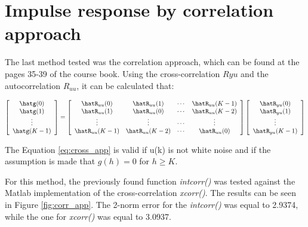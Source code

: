 \documentclass[a4paper,11pt]{article}
\newcommand{\Test}[1]{\expandafter\hat#1}
\begin{document}
\section{Impulse response by correlation approach}

The last method tested was the correlation approach, which can be found at the pages 35-39 of the course book. Using the cross-correlation $R{yu}$ and the autocorrelation $R_{uu}$, it can be calculated that:

\begin{equation}
\label{eq:cross_app}
  \left[ {\begin{array}{c}
   \Test{g(0)}\\
   \Test{g(1)}\\
   \vdots \\
   \Test{g(K-1)}
  \end{array} } \right] 
  = 
  \left[ {\begin{array}{cccc}
   \Test{R_{uu}}(0) & \Test{R_{uu}}(1) & \cdots & \Test{R_{uu}}(K-1)\\
   \Test{R_{uu}}(1) & \Test{R_{uu}}(0) & \cdots & \Test{R_{uu}}(K-2)\\
   \vdots & \vdots & \cdots & \vdots \\
   \Test{R_{uu}}(K-1) & \Test{R_{uu}}(K-2) & \cdots & 	\Test{R_{uu}}(0)
  \end{array} } \right]
  \left[ {\begin{array}{c}
   \Test{R_{yu}}(0)\\
   \Test{R_{yu}}(1)\\
   \vdots \\
   \Test{R_{yu}}(K-1)
  \end{array} } \right] 
\end{equation}

The Equation \ref{eq:cross_app} is valid if u(k) is not white noise and if the assumption is made that $g(h) = 0$ for $h \geq K$. 

For this method, the previously found function \textit{intcorr()} was tested against the Matlab implementation of the cross-correlation \textit{xcorr()}. The results can be seen in Figure \ref{fig:corr_app}. The 2-norm error for the \textit{intcorr()} was equal to 2.9374, while the one for \textit{xcorr()} was equal to 3.0937.
\end{document}
